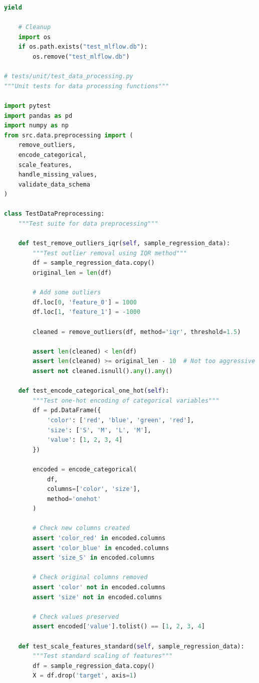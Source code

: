 \begin{lstlisting}[language=Python, caption=Comprehensive ML Testing Suite]
    yield

    # Cleanup
    import os
    if os.path.exists("test_mlflow.db"):
        os.remove("test_mlflow.db")

# tests/unit/test_data_processing.py
"""Unit tests for data processing functions"""

import pytest
import pandas as pd
import numpy as np
from src.data.preprocessing import (
    remove_outliers,
    encode_categorical,
    scale_features,
    handle_missing_values,
    validate_data_schema
)

class TestDataPreprocessing:
    """Test suite for data preprocessing"""

    def test_remove_outliers_iqr(self, sample_regression_data):
        """Test outlier removal using IQR method"""
        df = sample_regression_data.copy()
        original_len = len(df)

        # Add some outliers
        df.loc[0, 'feature_0'] = 1000
        df.loc[1, 'feature_1'] = -1000

        cleaned = remove_outliers(df, method='iqr', threshold=1.5)

        assert len(cleaned) < len(df)
        assert len(cleaned) >= original_len - 10  # Not too aggressive
        assert not cleaned.isnull().any().any()

    def test_encode_categorical_one_hot(self):
        """Test one-hot encoding of categorical variables"""
        df = pd.DataFrame({
            'color': ['red', 'blue', 'green', 'red'],
            'size': ['S', 'M', 'L', 'M'],
            'value': [1, 2, 3, 4]
        })

        encoded = encode_categorical(
            df,
            columns=['color', 'size'],
            method='onehot'
        )

        # Check new columns created
        assert 'color_red' in encoded.columns
        assert 'color_blue' in encoded.columns
        assert 'size_S' in encoded.columns

        # Check original columns removed
        assert 'color' not in encoded.columns
        assert 'size' not in encoded.columns

        # Check values preserved
        assert encoded['value'].tolist() == [1, 2, 3, 4]

    def test_scale_features_standard(self, sample_regression_data):
        """Test standard scaling of features"""
        df = sample_regression_data.copy()
        X = df.drop('target', axis=1)


\end{lstlisting}
